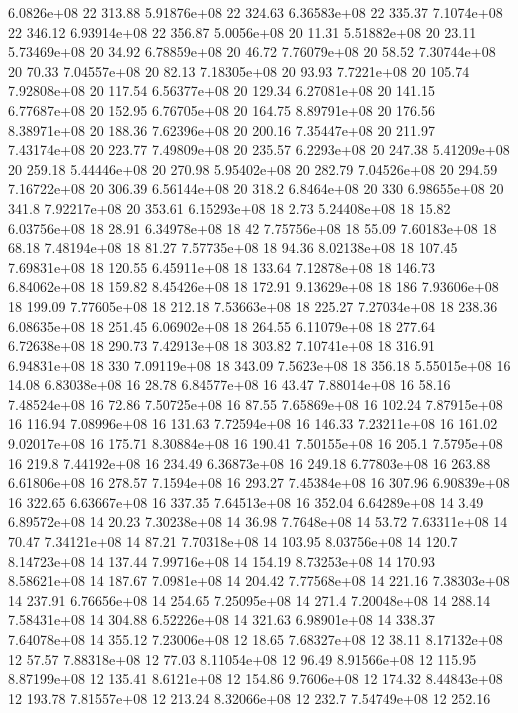 6.0826e+08 22 313.88
5.91876e+08 22 324.63
6.36583e+08 22 335.37
7.1074e+08 22 346.12
6.93914e+08 22 356.87
5.0056e+08 20 11.31
5.51882e+08 20 23.11
5.73469e+08 20 34.92
6.78859e+08 20 46.72
7.76079e+08 20 58.52
7.30744e+08 20 70.33
7.04557e+08 20 82.13
7.18305e+08 20 93.93
7.7221e+08 20 105.74
7.92808e+08 20 117.54
6.56377e+08 20 129.34
6.27081e+08 20 141.15
6.77687e+08 20 152.95
6.76705e+08 20 164.75
8.89791e+08 20 176.56
8.38971e+08 20 188.36
7.62396e+08 20 200.16
7.35447e+08 20 211.97
7.43174e+08 20 223.77
7.49809e+08 20 235.57
6.2293e+08 20 247.38
5.41209e+08 20 259.18
5.44446e+08 20 270.98
5.95402e+08 20 282.79
7.04526e+08 20 294.59
7.16722e+08 20 306.39
6.56144e+08 20 318.2
6.8464e+08 20 330
6.98655e+08 20 341.8
7.92217e+08 20 353.61
6.15293e+08 18 2.73
5.24408e+08 18 15.82
6.03756e+08 18 28.91
6.34978e+08 18 42
7.75756e+08 18 55.09
7.60183e+08 18 68.18
7.48194e+08 18 81.27
7.57735e+08 18 94.36
8.02138e+08 18 107.45
7.69831e+08 18 120.55
6.45911e+08 18 133.64
7.12878e+08 18 146.73
6.84062e+08 18 159.82
8.45426e+08 18 172.91
9.13629e+08 18 186
7.93606e+08 18 199.09
7.77605e+08 18 212.18
7.53663e+08 18 225.27
7.27034e+08 18 238.36
6.08635e+08 18 251.45
6.06902e+08 18 264.55
6.11079e+08 18 277.64
6.72638e+08 18 290.73
7.42913e+08 18 303.82
7.10741e+08 18 316.91
6.94831e+08 18 330
7.09119e+08 18 343.09
7.5623e+08 18 356.18
5.55015e+08 16 14.08
6.83038e+08 16 28.78
6.84577e+08 16 43.47
7.88014e+08 16 58.16
7.48524e+08 16 72.86
7.50725e+08 16 87.55
7.65869e+08 16 102.24
7.87915e+08 16 116.94
7.08996e+08 16 131.63
7.72594e+08 16 146.33
7.23211e+08 16 161.02
9.02017e+08 16 175.71
8.30884e+08 16 190.41
7.50155e+08 16 205.1
7.5795e+08 16 219.8
7.44192e+08 16 234.49
6.36873e+08 16 249.18
6.77803e+08 16 263.88
6.61806e+08 16 278.57
7.1594e+08 16 293.27
7.45384e+08 16 307.96
6.90839e+08 16 322.65
6.63667e+08 16 337.35
7.64513e+08 16 352.04
6.64289e+08 14 3.49
6.89572e+08 14 20.23
7.30238e+08 14 36.98
7.7648e+08 14 53.72
7.63311e+08 14 70.47
7.34121e+08 14 87.21
7.70318e+08 14 103.95
8.03756e+08 14 120.7
8.14723e+08 14 137.44
7.99716e+08 14 154.19
8.73253e+08 14 170.93
8.58621e+08 14 187.67
7.0981e+08 14 204.42
7.77568e+08 14 221.16
7.38303e+08 14 237.91
6.76656e+08 14 254.65
7.25095e+08 14 271.4
7.20048e+08 14 288.14
7.58431e+08 14 304.88
6.52226e+08 14 321.63
6.98901e+08 14 338.37
7.64078e+08 14 355.12
7.23006e+08 12 18.65
7.68327e+08 12 38.11
8.17132e+08 12 57.57
7.88318e+08 12 77.03
8.11054e+08 12 96.49
8.91566e+08 12 115.95
8.87199e+08 12 135.41
8.6121e+08 12 154.86
9.7606e+08 12 174.32
8.44843e+08 12 193.78
7.81557e+08 12 213.24
8.32066e+08 12 232.7
7.54749e+08 12 252.16
